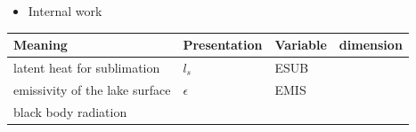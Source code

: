 \begin{itemize}
\tightlist
\item
  Internal work
\end{itemize}

\setlength\LTleft{0pt}\setlength\LTright{0pt}\begin{longtable}[]{@{}llll@{}}
\toprule\relax
\begin{minipage}[b]{0.39\columnwidth}\raggedright
Meaning\strut
\end{minipage} & \begin{minipage}[b]{0.33\columnwidth}\raggedright
Presentation\strut
\end{minipage} & \begin{minipage}[b]{0.08\columnwidth}\raggedright
Variable\strut
\end{minipage} & \begin{minipage}[b]{0.09\columnwidth}\raggedright
dimension\strut
\end{minipage}\tabularnewline
\midrule\relax
\endhead
\begin{minipage}[t]{0.39\columnwidth}\raggedright
latent heat for sublimation\strut
\end{minipage} & \begin{minipage}[t]{0.33\columnwidth}\raggedright
\(l_s\)\strut
\end{minipage} & \begin{minipage}[t]{0.08\columnwidth}\raggedright
ESUB\strut
\end{minipage} & \begin{minipage}[t]{0.09\columnwidth}\raggedright
\strut
\end{minipage}\tabularnewline
\begin{minipage}[t]{0.39\columnwidth}\raggedright
emissivity of the lake surface\strut
\end{minipage} & \begin{minipage}[t]{0.33\columnwidth}\raggedright
\(\epsilon\)\strut
\end{minipage} & \begin{minipage}[t]{0.08\columnwidth}\raggedright
EMIS\strut
\end{minipage} & \begin{minipage}[t]{0.09\columnwidth}\raggedright
\strut
\end{minipage}\tabularnewline
\begin{minipage}[t]{0.39\columnwidth}\raggedright
black body radiation\strut
\end{minipage} & \begin{minipage}[t]{0.33\columnwidth}\raggedright

\end{minipage}
\end{longtable}
